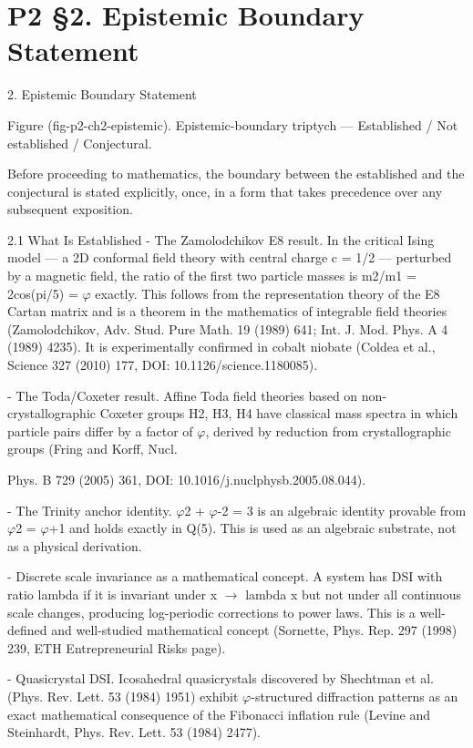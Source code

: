 
\section{P2 §2. Epistemic Boundary Statement}

2. Epistemic Boundary Statement

       Figure (fig-p2-ch2-epistemic). Epistemic-boundary triptych --- Established / Not established /
                                               Conjectural.

  Before proceeding to mathematics, the boundary between the established and the
  conjectural is stated explicitly, once, in a form that takes precedence over any
  subsequent exposition.

  2.1 What Is Established
  - The Zamolodchikov E8 result. In the critical Ising model --- a 2D conformal field theory
  with central charge c = 1/2 --- perturbed by a magnetic field, the ratio of the first two
  particle masses is m2/m1 = 2cos(pi/5) = $\varphi$ exactly. This follows from the representation
  theory of the E8 Cartan matrix and is a theorem in the mathematics of integrable field
  theories (Zamolodchikov, Adv. Stud. Pure Math. 19 (1989) 641; Int. J. Mod. Phys. A 4
  (1989) 4235). It is experimentally confirmed in cobalt niobate (Coldea et al., Science
  327 (2010) 177, DOI: 10.1126/science.1180085).

  - The Toda/Coxeter result. Affine Toda field theories based on non-crystallographic
  Coxeter groups H2, H3, H4 have classical mass spectra in which particle pairs differ by
  a factor of $\varphi$, derived by reduction from crystallographic groups (Fring and Korff, Nucl.

  Phys. B 729 (2005) 361, DOI: 10.1016/j.nuclphysb.2005.08.044).

  - The Trinity anchor identity. $\varphi$2 + $\varphi$-2 = 3 is an algebraic identity provable from $\varphi$2 =
  $\varphi$+1 and holds exactly in Q(5). This is used as an algebraic substrate, not as a physical
  derivation.

  - Discrete scale invariance as a mathematical concept. A system has DSI with ratio
  lambda if it is invariant under x $\rightarrow$ lambda x but not under all continuous scale changes,
  producing log-periodic corrections to power laws. This is a well-defined and
  well-studied mathematical concept (Sornette, Phys. Rep. 297 (1998) 239, ETH
  Entrepreneurial Risks page).

  - Quasicrystal DSI. Icosahedral quasicrystals discovered by Shechtman et al. (Phys.
  Rev. Lett. 53 (1984) 1951) exhibit $\varphi$-structured diffraction patterns as an exact
  mathematical consequence of the Fibonacci inflation rule (Levine and Steinhardt, Phys.
  Rev. Lett. 53 (1984) 2477).


